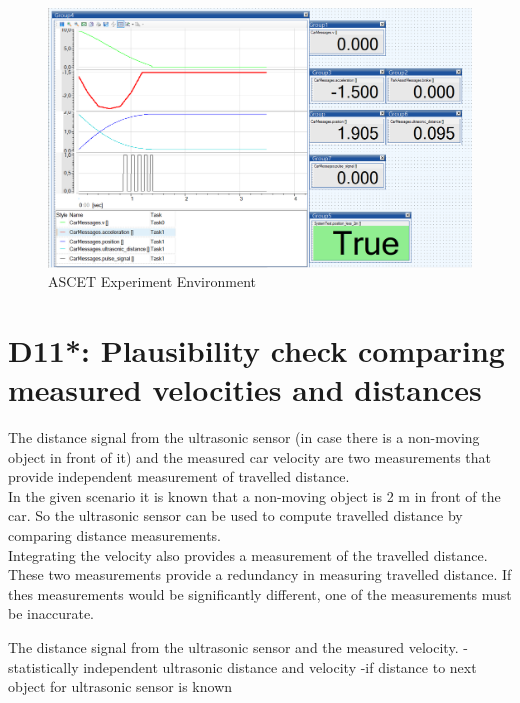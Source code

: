 \begin{figure}[H]
\centering
\includegraphics[width=1\textwidth]{images/ascet_experiment_environment.png}
\caption{ASCET Experiment Environment}
\label{fig:D10}
\end{figure}



\chapter{D11*: Plausibility check comparing measured velocities and distances}\label{cha:D11}
The distance signal from the ultrasonic sensor (in case there is a non-moving object in front of it) and the measured car velocity are two measurements that provide independent measurement of travelled distance.\\
In the given scenario it is known that a non-moving object is 2 m in front of the car. So the ultrasonic sensor can be used to compute travelled distance by comparing distance measurements.\\
Integrating the velocity also provides a measurement of the travelled distance. These two measurements provide a redundancy in measuring travelled distance. If thes measurements would be significantly different, one of the measurements must be inaccurate. 

The distance signal from the ultrasonic sensor and the measured velocity.
-statistically independent ultrasonic distance and velocity
-if distance to next object for ultrasonic sensor is known

